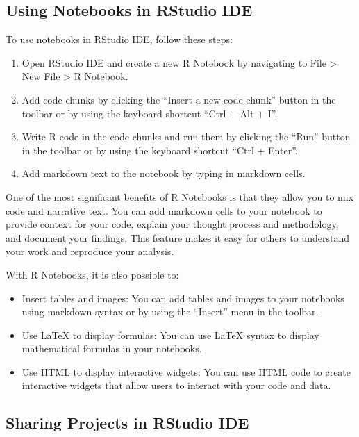 \documentclass[
]{book}
\providecommand{\tightlist}{%
  \setlength{\itemsep}{0pt}\setlength{\parskip}{0pt}}
\begin{document}
\hypertarget{using-notebooks-in-rstudio-ide}{%
\subsection{Using Notebooks in RStudio IDE}\label{using-notebooks-in-rstudio-ide}}

To use notebooks in RStudio IDE, follow these steps:

\begin{enumerate}
\def\labelenumi{\arabic{enumi}.}
\tightlist
\item
  Open RStudio IDE and create a new R Notebook by navigating to File \textgreater{} New File \textgreater{} R Notebook.
\item
  Add code chunks by clicking the ``Insert a new code chunk'' button in the toolbar or by using the keyboard shortcut ``Ctrl + Alt + I''.
\item
  Write R code in the code chunks and run them by clicking the ``Run'' button in the toolbar or by using the keyboard shortcut ``Ctrl + Enter''.
\item
  Add markdown text to the notebook by typing in markdown cells.
\end{enumerate}

One of the most significant benefits of R Notebooks is that they allow you to mix code and narrative text. You can add markdown cells to your notebook to provide context for your code, explain your thought process and methodology, and document your findings. This feature makes it easy for others to understand your work and reproduce your analysis.

With R Notebooks, it is also possible to:

\begin{itemize}
\tightlist
\item
  Insert tables and images: You can add tables and images to your notebooks using markdown syntax or by using the ``Insert'' menu in the toolbar.
\item
  Use LaTeX to display formulas: You can use LaTeX syntax to display mathematical formulas in your notebooks.
\item
  Use HTML to display interactive widgets: You can use HTML code to create interactive widgets that allow users to interact with your code and data.
\end{itemize}

\hypertarget{sharing-projects-in-rstudio-ide}{%
\subsection{Sharing Projects in RStudio IDE}\label{sharing-projects-in-rstudio-ide}}
\end{document}
